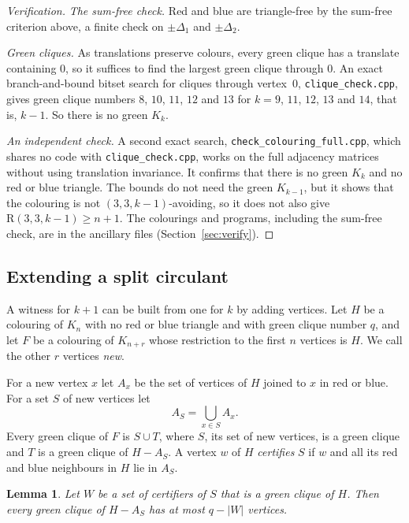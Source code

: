 \documentclass[11pt]{article}
\theoremstyle{spacedplain}
\newtheorem{lemma}[theorem]{Lemma}
\theoremstyle{spaceddef}
\theoremstyle{spacedremark}
\newcommand{\R}{\mathrm{R}}
\begin{document}
\begin{proof}[Verification]
\emph{The sum-free check.}
Red and blue are triangle-free by the sum-free criterion above, a finite check on $\pm\Delta_1$ and $\pm\Delta_2$.

\emph{Green cliques.}
As translations preserve colours, every green clique has a translate containing $0$, so it suffices to find the largest green clique through $0$.
An exact branch-and-bound bitset search for cliques through vertex~$0$, \texttt{clique\_check.cpp}, gives green clique numbers $8$, $10$, $11$, $12$ and $13$ for $k=9$, $11$, $12$, $13$ and $14$, that is, $k-1$.
So there is no green $K_k$.

\emph{An independent check.}
A second exact search, \texttt{check\_colouring\_full.cpp}, which shares no code with \texttt{clique\_check.cpp}, works on the full adjacency matrices without using translation invariance.
It confirms that there is no green $K_k$ and no red or blue triangle.
The bounds do not need the green $K_{k-1}$, but it shows that the colouring is not $(3,3,k-1)$-avoiding, so it does not also give $\R(3,3,k-1)\ge n+1$.
The colourings and programs, including the sum-free check, are in the ancillary files (Section~\ref{sec:verify}).
\end{proof}

\subsection{Extending a split circulant}\label{sec:extend}

A witness for $k+1$ can be built from one for $k$ by adding vertices.
Let $H$ be a colouring of $K_n$ with no red or blue triangle and with green clique number $q$, and let $F$ be a colouring of $K_{n+r}$ whose restriction to the first $n$ vertices is $H$.
We call the other $r$ vertices \emph{new}.

For a new vertex $x$ let $A_x$ be the set of vertices of $H$ joined to $x$ in red or blue.
For a set $S$ of new vertices let
\[
A_S=\bigcup_{x\in S}A_x.
\]
Every green clique of $F$ is $S\cup T$, where $S$, its set of new vertices, is a green clique and $T$ is a green clique of $H-A_S$.
A vertex $w$ of $H$ \emph{certifies} $S$ if $w$ and all its red and blue neighbours in $H$ lie in $A_S$.

\begin{lemma}\label{lem:cert}
Let $W$ be a set of certifiers of $S$ that is a green clique of $H$.
Then every green clique of $H-A_S$ has at most $q-|W|$ vertices.
\end{lemma}
\end{document}

